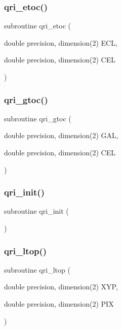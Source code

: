 \subsubsection{\texorpdfstring{qri\+\_\+etoc()}{qri\_etoc()}}
{\footnotesize\ttfamily subroutine qri\+\_\+etoc (\begin{DoxyParamCaption}\item[{double precision, dimension(2)}]{E\+CL,  }\item[{double precision, dimension(2)}]{C\+EL }\end{DoxyParamCaption})}

\mbox{\label{qri__init_8f_a21aca6ff94b837a90ea7c3a6e37b7202}} 
\subsubsection{\texorpdfstring{qri\+\_\+gtoc()}{qri\_gtoc()}}
{\footnotesize\ttfamily subroutine qri\+\_\+gtoc (\begin{DoxyParamCaption}\item[{double precision, dimension(2)}]{G\+AL,  }\item[{double precision, dimension(2)}]{C\+EL }\end{DoxyParamCaption})}

\mbox{\label{qri__init_8f_a5f65eb7c0a4007a53e262b20744dd277}} 
\subsubsection{\texorpdfstring{qri\+\_\+init()}{qri\_init()}}
{\footnotesize\ttfamily subroutine qri\+\_\+init (\begin{DoxyParamCaption}{ }\end{DoxyParamCaption})}

\mbox{\label{qri__init_8f_a2e089c76ba6463c7081fb26ecb5fc55f}} 
\subsubsection{\texorpdfstring{qri\+\_\+ltop()}{qri\_ltop()}}
{\footnotesize\ttfamily subroutine qri\+\_\+ltop (\begin{DoxyParamCaption}\item[{double precision, dimension(2)}]{X\+YP,  }\item[{double precision, dimension(2)}]{P\+IX }\end{DoxyParamCaption})}

